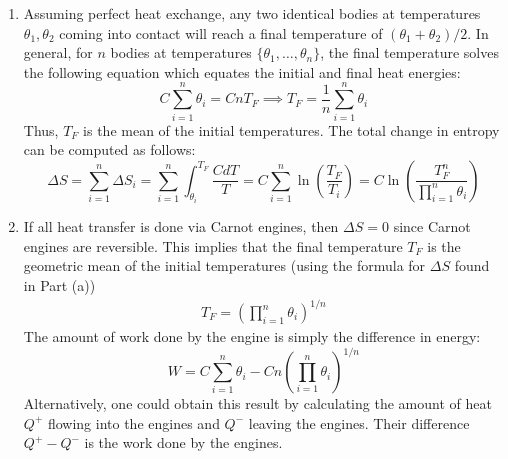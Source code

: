 \documentclass{article}
\theoremstyle{definition}
\newcommand{\f}[2]{\frac{#1}{#2}}
\newcommand{\lp}{\left(}
\newcommand{\rp}{\right)}
\begin{document}
\begin{enumerate}[label=(\alph*)]
	\item Assuming perfect heat exchange, any two identical bodies at temperatures $\theta_1,\theta_2$ coming into contact will reach a final temperature of $(\theta_1+\theta_2)/2$. In general, for $n$ bodies at temperatures $\{\theta_1,\dots,\theta_n\}$, the final temperature solves the following equation which equates the initial and final heat energies:
	\begin{equation*}
	C\sum_{i=1}^n \theta_i = CnT_F \implies \boxed{T_F = \f{1}{n}\sum_{i=1}^n \theta_i}
	\end{equation*}
	Thus, $T_F$ is the mean of the initial temperatures. The total change in entropy can be computed as follows:
	\begin{equation*}
	\Delta S = \sum_{i=1}^n \Delta S_i = \sum_{i=1}^n \int^{T_F}_{\theta_i} \f{CdT}{T} = C\sum_{i=1}^n \ln \lp \f{T_F}{T_i} \rp = \boxed{C\ln \lp \f{T_F^n}{\prod_{i=1}^n \theta_i} \rp}
	\end{equation*}
	
	
	
	\item If all heat transfer is done via Carnot engines, then $\Delta S = 0$ since Carnot engines are reversible. This implies that the final temperature $T_F$ is the geometric mean of the initial temperatures (using the formula for $\Delta S$ found in Part (a))
	\begin{align*}
	\boxed{T_F = \lp \prod_{i=1}^n \theta_i \rp^{1/n} }
	\end{align*}
	The amount of work done by the engine is simply the difference in energy:
	\begin{equation*}
	\boxed{W = C\sum^n_{i=1}\theta_i - Cn\lp \prod_{i=1}^n \theta_i \rp^{1/n}  }
	\end{equation*}
	Alternatively, one could obtain this result by calculating the amount of heat $Q^+$ flowing into the engines and $Q^-$ leaving the engines. Their difference $Q^+ - Q^-$ is the work done by the engines.   
	

\end{enumerate}
\end{document}
